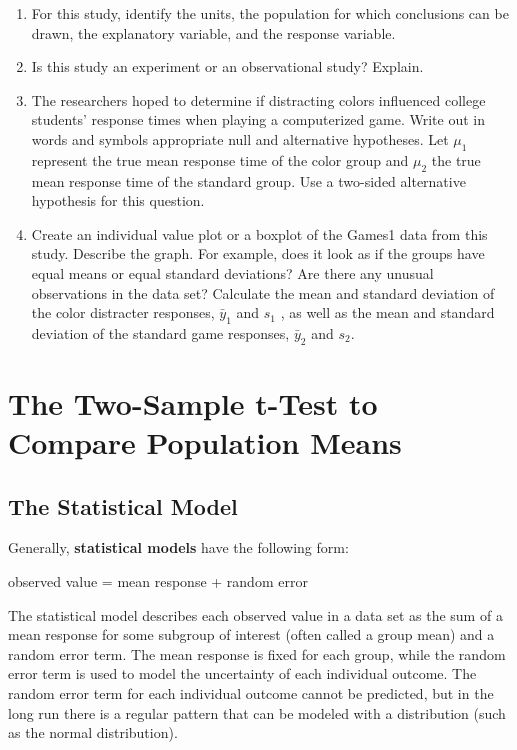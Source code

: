 \documentclass[
]{report}
\theoremstyle{definition}
\theoremstyle{definition}
\theoremstyle{definition}
\theoremstyle{definition}
\theoremstyle{remark}
\begin{document}
\begin{enumerate}
\def\labelenumi{\arabic{enumi}.}
\item
  For this study, identify the units, the population for which conclusions can be drawn, the explanatory variable, and the response variable.
\item
  Is this study an experiment or an observational study? Explain.
\item
  The researchers hoped to determine if distracting colors influenced college students' response times when playing a computerized game. Write out in words and symbols appropriate null and alternative hypotheses. Let \(\mu_1\) represent the true mean response time of the color group and \(\mu_2\) the true mean response time of the standard group. Use a two-sided alternative hypothesis for this question.
\item
  Create an individual value plot or a boxplot of the Games1 data from this study. Describe the graph. For example, does it look as if the groups have equal means or equal standard deviations? Are there any unusual observations in the data set? Calculate the mean and standard deviation of the color distracter responses, \(\bar{y}_1\) and \(s_1\) , as well as the mean and standard deviation of the standard game responses, \(\bar{y}_2\) and \(s_2\).
\end{enumerate}

\newpage

\hypertarget{the-two-sample-t-test-to-compare-population-means}{%
\section{The Two-Sample t-Test to Compare Population Means}\label{the-two-sample-t-test-to-compare-population-means}}

\hypertarget{the-statistical-model}{%
\subsection{The Statistical Model}\label{the-statistical-model}}

Generally, \textbf{statistical models} have the following form:

observed value = mean response + random error

The statistical model describes each observed value in a data set as the sum of a mean response for some subgroup of interest (often called a group mean) and a random error term. The mean response is fixed for each group, while the random error term is used to model the uncertainty of each individual outcome. The random error term for each individual outcome cannot be predicted, but in the long run there is a regular pattern that can be modeled with a distribution (such as the normal distribution).
\end{document}
